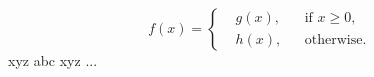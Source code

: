\[
	f(x) =
	\left\{
		\begin{aligned}
			 & g(x), &  & \text{if } x \geq 0, \\
			 & h(x), &  & \text{otherwise.}
		\end{aligned}
	\right.
\]
xyz abc xyz ...
